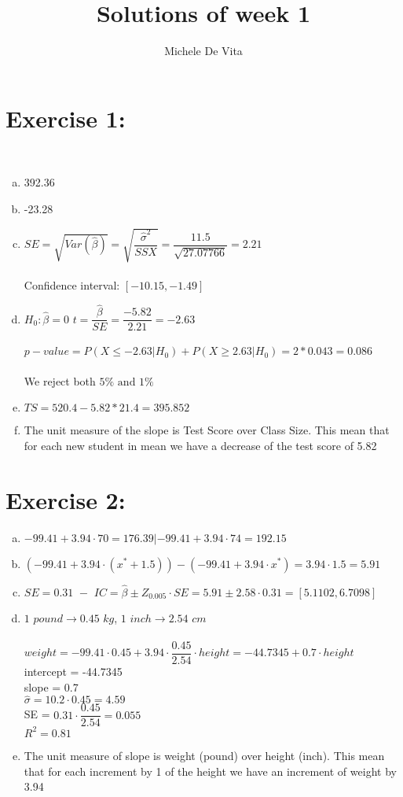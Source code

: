 \documentclass[10pt,a4paper]{article}
\author{Michele De Vita}
\title{Solutions of week 1}
\begin{document}
	\section*{Exercise 1:}\\
	\begin{enumerate}[a)]
		\item 392.36
		\item -23.28
		\item $ SE = \sqrt{Var(\hat{\beta})} = \sqrt{\dfrac{\hat{\sigma}^2}{SSX}} = \dfrac{11.5}{\sqrt{27.07766}} =  2.21$ \\\\
		Confidence interval: $ [-10.15, -1.49] $
		\item $ H_0: \hat{\beta} = 0 $ $ t = \dfrac{\hat{\beta}}{SE} = \dfrac{-5.82}{2.21} = -2.63 $ \\\\
		$ p-value = P(X \leq -2.63 | H_0) + P(X \geq 2.63 | H_0)  = 2 * 0.043 = 0.086$\\\\
		We reject both $ 5\% \text{ and } 1\% $
		\item $ TS = 520.4- 5.82 * 21.4 = 395.852$
		\item The unit measure of the slope is Test Score over Class Size. This mean that for each new student in mean we have a decrease of the test score of 5.82
	\end{enumerate}
	\section*{Exercise 2:}
	\begin{enumerate}[a)]
		\item $ -99.41 +3.94 \cdot 70 = 176.39 | -99.41 +3.94 \cdot 74 = 192.15$
		\item $ (-99.41 +3.94 \cdot (x^* + 1.5))  - (-99.41 +3.94 \cdot x^*) = 3.94\cdot 1.5 = 5.91$
		\item $ SE = 0.31 \,\, - \,\,IC = \hat{\beta} \pm Z_{0.005} \cdot SE = 5.91 \pm  2.58 \cdot 0.31 = [5.1102, 6.7098] $
		\item $ 1 \,\, pound \rightarrow 0.45 \,\, kg  $, $ 1 \,\, inch \rightarrow 2.54 \,\, cm $ \\\\ $ weight = -99.41 \cdot 0.45 + 3.94 \cdot \dfrac{0.45}{2.54}\cdot height = -44.7345 + 0.7 \cdot height$\\
		intercept = -44.7345 \\ slope = 0.7 \\ $ \hat{\sigma} = 10.2 \cdot 0.45 = 4.59$ \\  SE = $ 0.31 \cdot \dfrac{0.45}{2.54} = 0.055  $ \\$ R^2 = 0.81 $
		\item The unit measure of slope is weight (pound) over height (inch). This mean that for each increment by 1 of the height we have an increment of weight by 3.94
	\end{enumerate}
\end{document}

